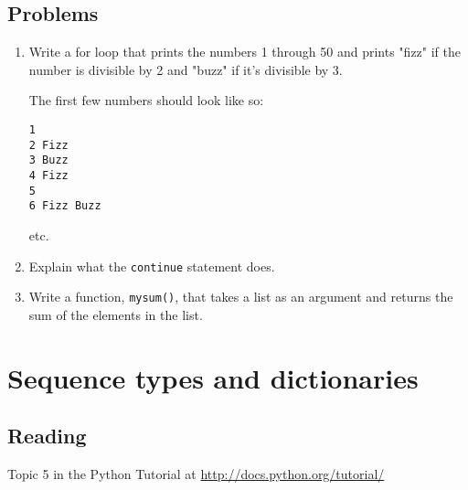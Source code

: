 \subsection{Problems}
\begin{enumerate}
	\item Write a for loop that prints the numbers 1 through 50 and prints "fizz" if the number is divisible by 2 and "buzz" if it's divisible by 3.

The first few numbers should look like so:
\begin{verbatim}
1
2 Fizz
3 Buzz
4 Fizz
5
6 Fizz Buzz
\end{verbatim}
etc.

	\item Explain what the \verb|continue| statement does.
	\item Write a function, \verb|mysum()|, that takes a list as an argument and returns the sum of the elements in the list.
\end{enumerate}	

\section{Sequence types and dictionaries}
\subsection{Reading}
Topic 5 in the Python Tutorial at \url{http://docs.python.org/tutorial/} \cite{website:Python272docs}
